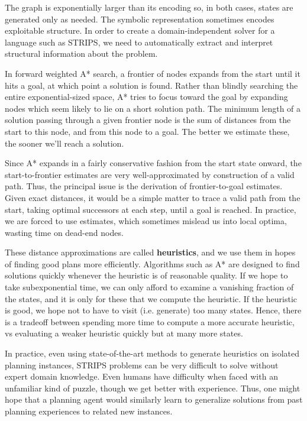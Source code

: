 \documentclass[letterpaper]{article}
\begin{document}
The graph is exponentially larger than its encoding so, in both cases, states are generated only as needed.
The symbolic representation sometimes encodes exploitable structure.
In order to create a domain-independent solver for a language such as STRIPS, we need to automatically extract and interpret structural information about the problem. 

In forward weighted A* search, a frontier of nodes expands from the start until it hits a goal, at which point a solution is found.
Rather than blindly searching the entire exponential-sized space, A* tries to focus toward the goal by expanding nodes which seem likely to lie on a short solution path.
The minimum length of a solution passing through a given frontier node is the sum of distances from the start to this node, and from this node to a goal.
The better we estimate these, the sooner we'll reach a solution.

Since A* expands in a fairly conservative fashion from the start state onward, the start-to-frontier estimates are very well-approximated by construction of a valid path.
Thus, the principal issue is the derivation of frontier-to-goal estimates.
Given exact distances, it would be a simple matter to trace a valid path from the start, taking optimal successors at each step, until a goal is reached.
In practice, we are forced to use estimates, which sometimes mislead us into local optima, wasting time on dead-end nodes.

These distance approximations are called \textbf{heuristics}, and we use them in hopes of finding good plans more efficiently.
Algorithms such as A* are designed to find solutions quickly whenever the heuristic is of reasonable quality.
If we hope to take subexponential time, we can only afford to examine a vanishing fraction of the states, and it is only for these that we compute the heuristic.
If the heuristic is good, we hope not to have to visit (i.e. generate) too many states.
Hence, there is a tradeoff between spending more time to compute a more accurate heuristic, vs evaluating a weaker heuristic quickly but at many more states.

In practice, even using state-of-the-art methods to generate heuristics on isolated planning instances, STRIPS problems can be very difficult to solve without expert domain knowledge.
Even humans have difficulty when faced with an unfamiliar kind of puzzle, though we get better with experience.
Thus, one might hope that a planning agent would similarly learn to generalize solutions from past planning experiences to related new instances.
\end{document}
